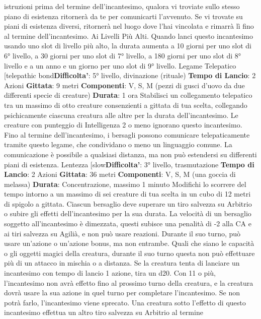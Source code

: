 \begin{multicols}{2}
istruzioni prima del termine dell’incantesimo, qualora vi
troviate sullo stesso piano di esistenza ritornerà da te
per comunicarti l’avvenuto. Se vi trovate su piani di
esistenza diversi, ritornerà nel luogo dove l’hai vincolata
e rimarrà lì fino al termine dell’incantesimo.
Ai Livelli Più Alti. Quando lanci questo incantesimo
usando uno slot di livello più alto, la durata aumenta a
10 giorni per uno slot di 6° livello, a 30 giorni per uno
slot di 7° livello, a 180 giorni per uno slot di 8° livello e a
un anno e un giorno per uno slot di 9° livello.
Legame Telepatico
[telepathic bond\textbf{Difficolta'}:
5° livello, divinazione (rituale)
\textbf{Tempo di Lancio}: 2 Azioni
\textbf{Gittata}: 9 metri
\textbf{Componenti}: V, S, M (pezzi di gusci d’uovo da due
differenti specie di creature)
\textbf{Durata}: 1 ora
Stabilisci un collegamento telepatico tra un massimo di
otto creature consenzienti a gittata di tua scelta,
collegando psichicamente ciascuna creatura alle altre
per la durata dell’incantesimo. Le creature con
punteggio di Intelligenza 2 o meno ignorano questo
incantesimo.
Fino al termine dell’incantesimo, i bersagli possono
comunicare telepaticamente tramite questo legame,
che condividano o meno un linguaggio comune. La
comunicazione è possibile a qualsiasi distanza, ma non
può estendersi su differenti piani di esistenza.
Lentezza
[slow\textbf{Difficolta'}:
3° livello, trasmutazione
\textbf{Tempo di Lancio}: 2 Azioni
\textbf{Gittata}: 36 metri
\textbf{Componenti}: V, S, M (una goccia di melassa)
\textbf{Durata}: Concentrazione, massimo 1 minuto
Modifichi lo scorrere del tempo intorno a un massimo di
sei creature di tua scelta in un cubo di 12 metri di
spigolo a gittata. Ciascun bersaglio deve superare un
tiro salvezza su Arbitrio o subire gli effetti
dell’incantesimo per la sua durata.
La velocità di un bersaglio soggetto all’incantesimo è
dimezzata, questi subisce una penalità di -2 alla CA e ai
tiri salvezza su Agilià, e non può usare reazioni.
Durante il suo turno, può usare un’azione o un’azione
bonus, ma non entrambe. Quali che siano le capacità o
gli oggetti magici della creatura, durante il suo turno
questa non può effettuare più di un attacco in mischia o
a distanza.
Se la creatura tenta di lanciare un incantesimo con
tempo di lancio 1 azione, tira un d20. Con 11 o più,
l’incantesimo non avrà effetto fino al prossimo turno
della creatura, e la creatura dovrà usare la sua azione
in quel turno per completare l’incantesimo. Se non potrà
farlo, l’incantesimo viene sprecato.
Una creatura sotto l’effetto di questo incantesimo
effettua un altro tiro salvezza su Arbitrio al termine

\end{multicols}
